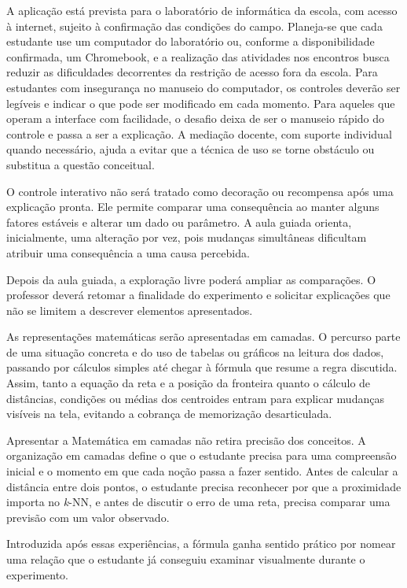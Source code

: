 A aplicação está prevista para o laboratório de informática da escola, com acesso à internet, sujeito à confirmação das condições do campo. Planeja-se que cada estudante use um computador do laboratório ou, conforme a disponibilidade confirmada, um Chromebook, e a realização das atividades nos encontros busca reduzir as dificuldades decorrentes da restrição de acesso fora da escola. Para estudantes com insegurança no manuseio do computador, os controles deverão ser legíveis e indicar o que pode ser modificado em cada momento. Para aqueles que operam a interface com facilidade, o desafio deixa de ser o manuseio rápido do controle e passa a ser a explicação. A mediação docente, com suporte individual quando necessário, ajuda a evitar que a técnica de uso se torne obstáculo ou substitua a questão conceitual.

O controle interativo não será tratado como decoração ou recompensa após uma explicação pronta. Ele permite comparar uma consequência ao manter alguns fatores estáveis e alterar um dado ou parâmetro. A aula guiada orienta, inicialmente, uma alteração por vez, pois mudanças simultâneas dificultam atribuir uma consequência a uma causa percebida.

Depois da aula guiada, a exploração livre poderá ampliar as comparações. O professor deverá retomar a finalidade do experimento e solicitar explicações que não se limitem a descrever elementos apresentados.

As representações matemáticas serão apresentadas em camadas. O percurso parte de uma situação concreta e do uso de tabelas ou gráficos na leitura dos dados, passando por cálculos simples até chegar à fórmula que resume a regra discutida. Assim, tanto a equação da reta e a posição da fronteira quanto o cálculo de distâncias, condições ou médias dos centroides entram para explicar mudanças visíveis na tela, evitando a cobrança de memorização desarticulada.

Apresentar a Matemática em camadas não retira precisão dos conceitos. A organização em camadas define o que o estudante precisa para uma compreensão inicial e o momento em que cada noção passa a fazer sentido. Antes de calcular a distância entre dois pontos, o estudante precisa reconhecer por que a proximidade importa no \textit{k}-NN, e antes de discutir o erro de uma reta, precisa comparar uma previsão com um valor observado.

Introduzida após essas experiências, a fórmula ganha sentido prático por nomear uma relação que o estudante já conseguiu examinar visualmente durante o experimento.

